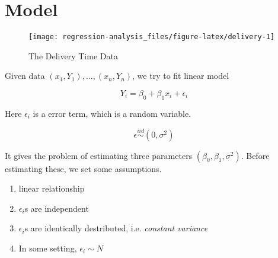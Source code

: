 \documentclass[]{book}
\newenvironment{Shaded}{\begin{snugshade}}{\end{snugshade}}
\newcommand{\KeywordTok}[1]{\textcolor[rgb]{0.13,0.29,0.53}{\textbf{#1}}}
\newcommand{\DataTypeTok}[1]{\textcolor[rgb]{0.13,0.29,0.53}{#1}}
\newcommand{\DecValTok}[1]{\textcolor[rgb]{0.00,0.00,0.81}{#1}}
\newcommand{\StringTok}[1]{\textcolor[rgb]{0.31,0.60,0.02}{#1}}
\newcommand{\OperatorTok}[1]{\textcolor[rgb]{0.81,0.36,0.00}{\textbf{#1}}}
\newcommand{\NormalTok}[1]{#1}
\providecommand{\tightlist}{%
  \setlength{\itemsep}{0pt}\setlength{\parskip}{0pt}}
\theoremstyle{definition}
\theoremstyle{definition}
\theoremstyle{definition}
\theoremstyle{remark}
\begin{document}
\section{Model}\label{model}

\begin{Shaded}
\end{Shaded}

\begin{Shaded}
\end{Shaded}

\begin{figure}[H]

{\centering \texttt{[image: regression-analysis\_files/figure-latex/delivery-1]} 

}

\caption{The Delivery Time Data}\label{fig:delivery}
\end{figure}

Given data \((x_1, Y_1), \ldots, (x_n, Y_n)\), we try to fit linear
model

\[Y_i = \beta_0 + \beta_1 x_i + \epsilon_i\]

Here \(\epsilon_i\) is a error term, which is a random variable.

\[\epsilon \stackrel{iid}{\sim} (0, \sigma^2)\]

It gives the problem of estimating three parameters
\((\beta_0, \beta_1, \sigma^2)\). Before estimating these, we set some
assumptions.

\begin{enumerate}
\def\labelenumi{\arabic{enumi}.}
\tightlist
\item
  linear relationship
\item
  \(\epsilon_i\)s are independent
\item
  \(\epsilon_i\)s are identically destributed, i.e. \emph{constant
  variance}
\item
  In some setting, \(\epsilon_i \sim N\)
\end{enumerate}
\end{document}
